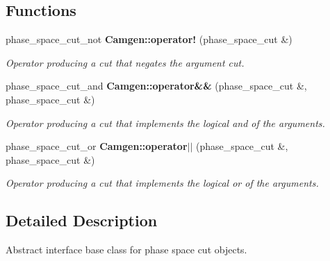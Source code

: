 \subsection*{Functions}
\begin{DoxyCompactItemize}
\item 
\hypertarget{a00878_a26acdc0b99758409ccded0a9f08eeca3}{}phase\+\_\+space\+\_\+cut\+\_\+not {\bfseries Camgen\+::operator!} (phase\+\_\+space\+\_\+cut \&)\label{a00878_a26acdc0b99758409ccded0a9f08eeca3}

\begin{DoxyCompactList}\small\item\em Operator producing a cut that negates the argument cut. \end{DoxyCompactList}\item 
\hypertarget{a00878_a664f304b8f6f43326223ef16057e1e1a}{}phase\+\_\+space\+\_\+cut\+\_\+and {\bfseries Camgen\+::operator\&\&} (phase\+\_\+space\+\_\+cut \&, phase\+\_\+space\+\_\+cut \&)\label{a00878_a664f304b8f6f43326223ef16057e1e1a}

\begin{DoxyCompactList}\small\item\em Operator producing a cut that implements the logical \textquotesingle{}and\textquotesingle{} of the arguments. \end{DoxyCompactList}\item 
\hypertarget{a00878_a441355efea917b6bda0dad1f1b2a3449}{}phase\+\_\+space\+\_\+cut\+\_\+or {\bfseries Camgen\+::operator$\vert$$\vert$} (phase\+\_\+space\+\_\+cut \&, phase\+\_\+space\+\_\+cut \&)\label{a00878_a441355efea917b6bda0dad1f1b2a3449}

\begin{DoxyCompactList}\small\item\em Operator producing a cut that implements the logical \textquotesingle{}or\textquotesingle{} of the arguments. \end{DoxyCompactList}\end{DoxyCompactItemize}


\subsection{Detailed Description}
Abstract interface base class for phase space cut objects. 

